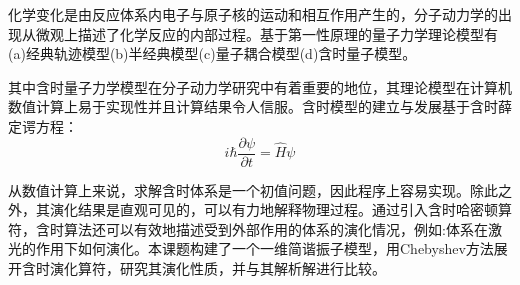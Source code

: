 
化学变化是由反应体系内电子与原子核的运动和相互作用产生的，分子动力学的出现从微观上描述了化学反应的内部过程。基于第一性原理的量子力学理论模型有(a)经典轨迹模型(b)半经典模型(c)量子耦合模型(d)含时量子模型。

其中含时量子力学模型在分子动力学研究中有着重要的地位，其理论模型在计算机数值计算上易于实现性并且计算结果令人信服。含时模型的建立与发展基于含时薛定谔方程：
\begin{equation}
  i \hbar \frac{\partial \psi}{\partial t} = \hat{H} \psi  
\label{eq:td-Schrodinger}
\end{equation} 

从数值计算上来说，求解含时体系是一个初值问题，因此程序上容易实现。除此之外，其演化结果是直观可见的，可以有力地解释物理过程。通过引入含时哈密顿算符，含时算法还可以有效地描述受到外部作用的体系的演化情况，例如:体系在激光的作用下如何演化。本课题构建了一个一维简谐振子模型，用Chebyshev方法展开含时演化算符，研究其演化性质，并与其解析解进行比较。